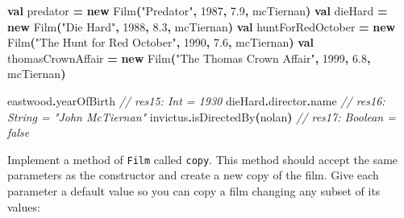 \documentclass[11pt,a5paper,]{book}
\newenvironment{Shaded}{\begin{snugshade}}{\end{snugshade}}
\newcommand{\CommentTok}[1]{\textcolor[rgb]{0.56,0.35,0.01}{\textit{#1}}}
\newcommand{\DecValTok}[1]{\textcolor[rgb]{0.00,0.00,0.81}{#1}}
\newcommand{\FloatTok}[1]{\textcolor[rgb]{0.00,0.00,0.81}{#1}}
\newcommand{\FunctionTok}[1]{\textcolor[rgb]{0.00,0.00,0.00}{#1}}
\newcommand{\KeywordTok}[1]{\textcolor[rgb]{0.13,0.29,0.53}{\textbf{#1}}}
\newcommand{\NormalTok}[1]{#1}
\newcommand{\OperatorTok}[1]{\textcolor[rgb]{0.81,0.36,0.00}{\textbf{#1}}}
\newcommand{\StringTok}[1]{\textcolor[rgb]{0.31,0.60,0.02}{#1}}
\begin{document}
\begin{Shaded}
\begin{Highlighting}[]
\KeywordTok{val}\NormalTok{ predator          }\OperatorTok{=} \KeywordTok{new} \FunctionTok{Film}\OperatorTok{(}\StringTok{"Predator"}\OperatorTok{,} \DecValTok{1987}\OperatorTok{,} \FloatTok{7.9}\OperatorTok{,}\NormalTok{ mcTiernan}\OperatorTok{)}
\KeywordTok{val}\NormalTok{ dieHard           }\OperatorTok{=} \KeywordTok{new} \FunctionTok{Film}\OperatorTok{(}\StringTok{"Die Hard"}\OperatorTok{,} \DecValTok{1988}\OperatorTok{,} \FloatTok{8.3}\OperatorTok{,}\NormalTok{ mcTiernan}\OperatorTok{)}
\KeywordTok{val}\NormalTok{ huntForRedOctober }\OperatorTok{=} \KeywordTok{new} \FunctionTok{Film}\OperatorTok{(}\StringTok{"The Hunt for Red October"}\OperatorTok{,} \DecValTok{1990}\OperatorTok{,} \FloatTok{7.6}\OperatorTok{,}\NormalTok{ mcTiernan}\OperatorTok{)}
\KeywordTok{val}\NormalTok{ thomasCrownAffair }\OperatorTok{=} \KeywordTok{new} \FunctionTok{Film}\OperatorTok{(}\StringTok{"The Thomas Crown Affair"}\OperatorTok{,} \DecValTok{1999}\OperatorTok{,} \FloatTok{6.8}\OperatorTok{,}\NormalTok{ mcTiernan}\OperatorTok{)}
\end{Highlighting}
\end{Shaded}

\begin{Shaded}
\begin{Highlighting}[]
\NormalTok{eastwood}\OperatorTok{.}\NormalTok{yearOfBirth}
\CommentTok{// res15: Int = 1930}
\NormalTok{dieHard}\OperatorTok{.}\NormalTok{director}\OperatorTok{.}\NormalTok{name}
\CommentTok{// res16: String = "John McTiernan"}
\NormalTok{invictus}\OperatorTok{.}\FunctionTok{isDirectedBy}\OperatorTok{(}\NormalTok{nolan}\OperatorTok{)}
\CommentTok{// res17: Boolean = false}
\end{Highlighting}
\end{Shaded}

Implement a method of \texttt{Film} called \texttt{copy}. This method
should accept the same parameters as the constructor and create a new
copy of the film. Give each parameter a default value so you can copy a
film changing any subset of its values:
\end{document}
